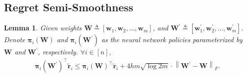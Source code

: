 \documentclass[10pt]{article}
\def\rvw{{\mathbf{w}}}
\def\rvtilder{{\tilde{\mathbf{r}}}}
\newtheorem{lem}{Lemma}
\def\rvpi{{\boldsymbol{\pi}}}
\def\rmW{{\mathbf{W}}}
\begin{document}
\subsection{Regret Semi-Smoothness}

\begin{lem}
    Given weights $\rmW \triangleq \left[ \rvw_1, \rvw_2, \dots, \rvw_m \right]$, and $\rmW^\prime \triangleq \left[ \rvw_1^\prime, \rvw_2^\prime, \dots, \rvw_m^\prime \right]$. Denote $\rvpi_i\left( \rmW \right)$ and $\rvpi_i\left( \rmW^\prime \right)$ as the neural network policies parameterized by $\rmW$ and $\rmW^\prime$, respectively. $\forall i \in [n]$,
\begin{equation*}
\begin{split}
    \rvpi_i\left( \rmW^\prime \right)^\top \rvtilder_i \le \rvpi_i\left( \rmW \right)^\top \rvtilder_i + 4 h m \sqrt{\log{2m}} \cdot \left\| \rmW^\prime - \rmW \right\|_F.
\end{split}
\end{equation*}
\end{lem}
\end{document}
